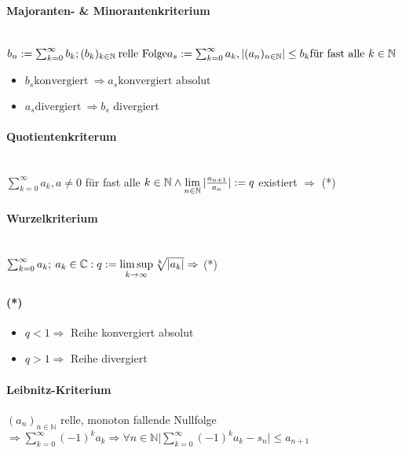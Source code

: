 \documentclass[paper=a3,paper=landscape, fontsize=9pt,DIV=25]{scrartcl}
\newcommand{\compl}{\mathbb{C}}
\newcommand{\nat}{\mathbb{N}}
\newcommand{\aseq}{(a_n)_{n \in \nat}}
\begin{document}
\begin{multicols*}{4}
  \paragraph{Majoranten- \& Minorantenkriterium}\hspace{0pt} \\
  $ b_n := \sum_{k=0}^{\infty} b_k; (b_k)_{k \in \nat}\:\text{relle Folge}\\ a_s := \sum_{k=0}^{\infty} a_k, |\aseq| \leq b_k \text{für fast alle}\ k \in \nat$
  \begin{itemize}
  \item $b_s \text{konvergiert}\ \Rightarrow a_s \text{konvergiert absolut}$
  \item $a_s \text{divergiert}\ \Rightarrow b_s$ divergiert
  \end{itemize}


  \paragraph{Quotientenkriterum}\hspace{0pt} \\
  $ \sum_{k=0}^{\infty} a_k, a \neq 0$ für fast alle $k \in \nat \wedge \lim\limits_{n \in \nat} \arrowvert \frac{a_{n+1}}{a_n} \arrowvert := q$ existiert $\Rightarrow$ (*)


  \paragraph{Wurzelkriterium}\hspace{0pt} \\
  $ \sum_{k=0}^{\infty} a_k;\:a_k \in \compl: q := \limsup\limits_{k \rightarrow \infty} \sqrt[k]{\arrowvert a_k \arrowvert} \Rightarrow$ (*)


  \paragraph{(*)}
  \begin{itemize}
  \item $q < 1 \Rightarrow$ Reihe konvergiert absolut
  \item $q > 1 \Rightarrow$ Reihe divergiert
  \end{itemize}


  \paragraph{Leibnitz-Kriterium}
  $\aseq$ relle, monoton fallende Nullfolge $ \Rightarrow \sum_{k=0}^{\infty} (-1)^ka_k \Rightarrow \forall n \in \nat \lvert \sum_{k=0}^{\infty}(-1)^ka_k-s_n \rvert \leq  a_{n+1}$



\end{multicols*}
\end{document}
